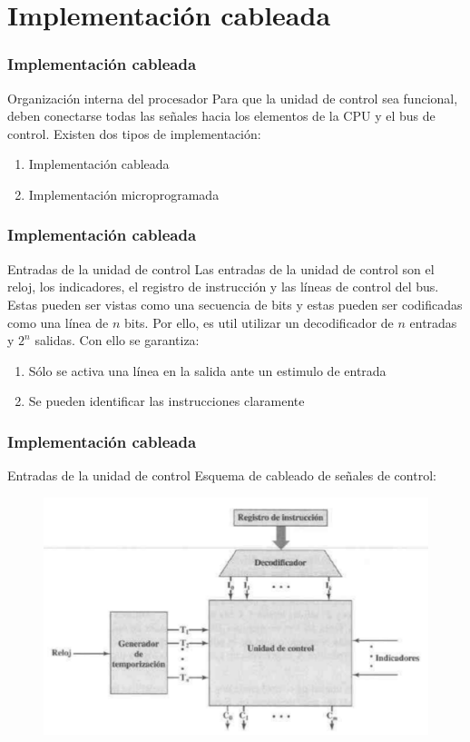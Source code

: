 \documentclass{beamer}
\begin{document}
\section{Implementación cableada}


\begin{frame}
	\frametitle{Implementación cableada}
	\begin{block}{Organización interna del procesador}
	Para que la unidad de control sea funcional, deben conectarse todas las señales hacia los elementos de la CPU y el bus de control. Existen dos tipos de implementación:
	\begin{enumerate}
		\item Implementación cableada
		\item Implementación microprogramada
	\end{enumerate}
	\end{block}
\end{frame}


\begin{frame}
	\frametitle{Implementación cableada}
	\begin{block}{Entradas de la unidad de control}
	Las entradas de la unidad de control son el reloj, los indicadores, el registro de instrucción y las líneas de control del bus. Estas pueden ser vistas como una secuencia de bits y estas pueden ser codificadas como una línea de $n$ bits. Por ello, es util utilizar un decodificador de $n$ entradas y $2^n$ salidas. Con ello se garantiza:
	\begin{enumerate}
		\item Sólo se activa una línea en la salida ante un estimulo de entrada
		\item Se pueden identificar las instrucciones claramente
	\end{enumerate}
	\end{block}
\end{frame}

\begin{frame}
	\frametitle{Implementación cableada}
	\begin{block}{Entradas de la unidad de control}
	Esquema de cableado de señales de control:
	\end{block}		 		
	\begin{figure}[H]
		\centering
		\includegraphics[scale=0.4]{imagenes/controlsignal.png} 
	\end{figure}
\end{frame}
\end{document}
